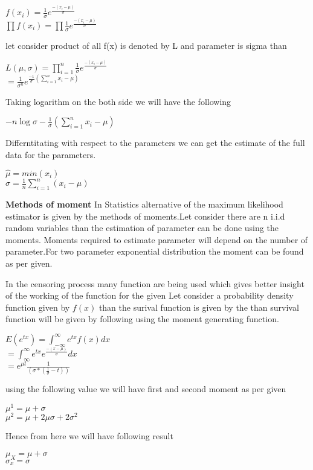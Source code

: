 \documentclass[12pt]{article}
\begin{document}
  \begin{center}
  	$f(x_{i})= \frac{1}{\sigma} e^{\frac{-(x_{i}-\mu)}{\sigma}}$\\
  	$\prod f(x_{i})=\prod  \frac{1}{\sigma} e^{\frac{-(x_{i}-\mu)}{\sigma}} $
  	\begin{flushleft}
  	let consider product of all f(x) is denoted by L and parameter is sigma than
  	\end{flushleft}
  	$L(\mu,\sigma)=\prod_{i=1}^{n} \frac{1}{\sigma} e^{\frac{-(x_{i}-\mu)}{\sigma}}$\\
  	$=\frac{1}{\sigma^n} e^{\frac{-1}{\sigma} (\sum_{i=1}^{n} x_{i}-\mu)}$\\
  		\begin{flushleft}
  			Taking logarithm on the both side we will have the following
  		\end{flushleft}
  	$-n\log{\sigma}-\frac{1}{\sigma}(\sum_{i=1}^{n} x_{i}-\mu)$
  	\begin{flushleft}
  		Differntitating with respect to the parameters we can get the estimate of the full data for the parameters.
  	\end{flushleft}
  	$\hat{\mu}=min(x_{i})$\\
  	$\hat{\sigma}=\frac{1}{n} \sum_{i=1}^{n}(x_{i}-\mu)$
  	
  \end{center}
 
 \textbf{Methods of moment}
 In Statistics alternative of the maximum likelihood estimator is given by the methods of moments.Let consider there are n i.i.d random variables than the estimation of parameter can be done using the moments. Moments required to estimate parameter will depend on the number of parameter.For two parameter exponential distribution the moment can be found as per given.
  
 

In the censoring process many function are being used which gives better insight of the working of the function for the given
Let consider a probability density function given by $f(x)$ than the surival function is given by the than survival function will be given by following using the moment generating function.\\
\begin{center}
	$E(e^{tx})=\int_{-\infty}^{\infty} e^{tx} f(x) dx$\\
	$=\int_{\infty}^{\infty} e^{tx} e^{\frac{-(x-\mu)}{\sigma}} dx$\\
	$=e^{\mu t}\frac{1}{(\sigma*(\frac{1}{\sigma}-t))}$
\end{center}
using the following value we will have first and second moment as per given 
\begin{center}
	$\mu^{1}=\mu+\sigma$\\
	$\mu^2=\mu+2\mu \sigma +2\sigma^2$
\end{center}
Hence from here we will have following result
\begin{center}
	$\mu_{X}=\mu+\sigma$\\
	$\sigma_{x}=\sigma$\\
\end{center}
\end{document}
